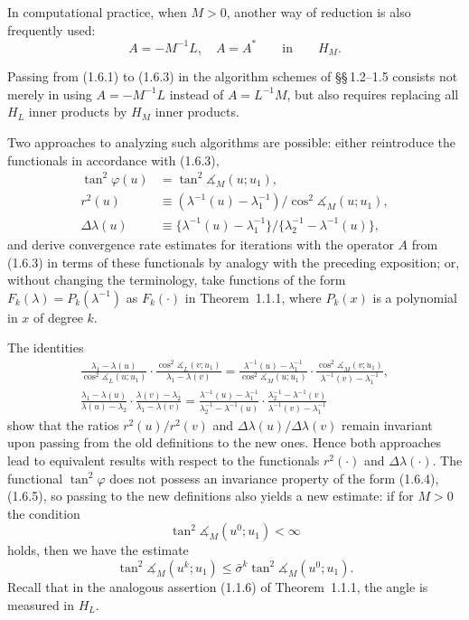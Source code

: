 \documentclass[11pt,oneside]{book}
\newcommand{\ang}{\measuredangle}
\begin{document}
In computational practice, when $M > 0$, another way of reduction is also frequently used:
\[
A = -M^{-1}L, \quad A = A^* \qquad \text{in} \qquad H_M. \tag{1.6.3}
\]

Passing from (1.6.1) to (1.6.3) in the algorithm schemes of \S\S\,1.2--1.5 consists not merely in using $A = -M^{-1}L$ instead of $A = L^{-1}M$, but also requires replacing all $H_L$ inner products by $H_M$ inner products.

Two approaches to analyzing such algorithms are possible: either reintroduce the functionals in accordance with (1.6.3),
\[
\begin{aligned}
\tan^2\varphi(u) &= \tan^2\ang_M(u; u_1), \\
r^2(u) &\equiv (\lambda^{-1}(u) - \lambda_1^{-1}) / \cos^2\ang_M(u; u_1), \\
\Delta\lambda(u) &\equiv \{\lambda^{-1}(u) - \lambda_1^{-1}\} / \{\lambda_2^{-1} - \lambda^{-1}(u)\},
\end{aligned}
\]
and derive convergence rate estimates for iterations with the operator $A$ from (1.6.3) in terms of these functionals by analogy with the preceding exposition; or, without changing the terminology, take functions of the form $F_k(\lambda) = P_k(\lambda^{-1})$ as $F_k(\cdot)$ in Theorem~1.1.1, where $P_k(x)$ is a polynomial in $x$ of degree $k$.

The identities
\begin{gather*}
\frac{\lambda_1 - \lambda(u)}{\cos^2\ang_L(u; u_1)} \cdot \frac{\cos^2\ang_L(v; u_1)}{\lambda_1 - \lambda(v)} = \frac{\lambda^{-1}(u) - \lambda_1^{-1}}{\cos^2\ang_M(u; u_1)} \cdot \frac{\cos^2\ang_M(v; u_1)}{\lambda^{-1}(v) - \lambda_1^{-1}}, \tag{1.6.4} \\[4pt]
\frac{\lambda_1 - \lambda(u)}{\lambda(u) - \lambda_2} \cdot \frac{\lambda(v) - \lambda_2}{\lambda_1 - \lambda(v)} = \frac{\lambda^{-1}(u) - \lambda_1^{-1}}{\lambda_2^{-1} - \lambda^{-1}(u)} \cdot \frac{\lambda_2^{-1} - \lambda^{-1}(v)}{\lambda^{-1}(v) - \lambda_1^{-1}} \tag{1.6.5}
\end{gather*}
show that the ratios $r^2(u)/r^2(v)$ and $\Delta\lambda(u)/\Delta\lambda(v)$ remain invariant upon passing from the old definitions to the new ones. Hence both approaches lead to equivalent results with respect to the functionals $r^2(\cdot)$ and $\Delta\lambda(\cdot)$. The functional $\tan^2\varphi$ does not possess an invariance property of the form (1.6.4), (1.6.5), so passing to the new definitions also yields a new estimate: if for $M > 0$ the condition
\[
\tan^2\ang_M(u^0; u_1) < \infty \tag{1.6.6}
\]
holds, then we have the estimate
\[
\tan^2\ang_M(u^k; u_1) \leqslant \bar{\sigma}^k \tan^2\ang_M(u^0; u_1). \tag{1.6.7}
\]
Recall that in the analogous assertion (1.1.6) of Theorem~1.1.1, the angle is measured in $H_L$.
\end{document}
